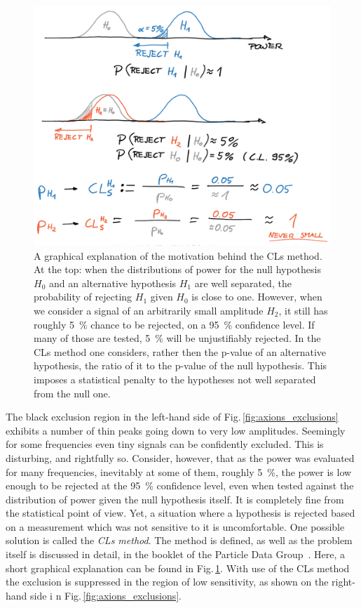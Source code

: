 \begin{figure}
  \centering \includegraphics[width=0.8\linewidth]{gfx/axions/CLs.png}
  \caption{A graphical explanation of the motivation behind the CLs method. At the top: when the distributions of power for the null hypothesis $H_0$ and an alternative hypothesis $H_1$ are well separated, the probability of rejecting $H_1$ given $H_0$ is close to one. However, when we consider a signal of an arbitrarily small amplitude $H_2$, it still has roughly \SI{5}{\percent} chance to be rejected, on a \SI{95}{\percent} confidence level. If many of those are tested, \SI{5}{\percent} will be unjustifiably rejected. In the CLs method one considers, rather then the p-value of an alternative hypothesis, the ratio of it to the p-value of the null hypothesis. This imposes a statistical penalty to the hypotheses not well separated from the null one.}\label{fig:CLs}
\end{figure}

The black exclusion region in the left-hand side of Fig.\,\ref{fig:axions_exclusions} exhibits a number of thin peaks going down to very low amplitudes. Seemingly for some frequencies even tiny signals can be confidently excluded. This is disturbing, and rightfully so.
Consider, however, that as the power was evaluated for many frequencies, inevitably at some of them, roughly \SI{5}{\percent}, the power is low enough to be rejected at the \SI{95}{\percent} confidence level, even when tested against the distribution of power given the null hypothesis itself.
It is completely fine from the statistical point of view. Yet, a situation where a hypothesis is rejected based on a measurement which was not sensitive to it is uncomfortable.
One possible solution is called the \emph{CLs method}. The method is defined, as well as the problem itself is discussed in detail, in the booklet of the Particle Data Group~\cite{PDG2016}. Here, a short graphical explanation can be found in Fig.\,\ref{fig:CLs}. With use of the CLs method the exclusion is suppressed in the region of low sensitivity, as shown on the right-hand side i n Fig.\,\ref{fig:axions_exclusions}.

